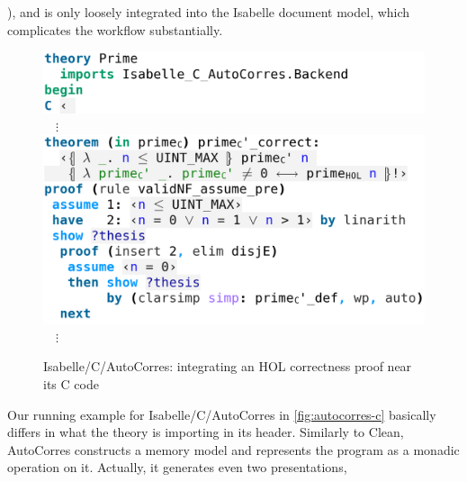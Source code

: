 \begin{isabellebody}
\begin{isamarkuptext}
), and is only loosely integrated into the Isabelle document
model, which complicates the workflow substantially.%
\end{isamarkuptext}\isamarkuptrue%
%
\begin{isamarkuptext}%
\begin{figure}
  \centering
\begin{minipage}{0.48\textwidth}
\includegraphics[width=\textwidth]{figures/A-C-Source80}\vspace{-3pt}\hfill\allowbreak%
\vspace{0pt}$\quad\vdots$\vspace{2pt}\hfill\allowbreak%
\includegraphics[width=\textwidth]{figures/A-C-Source8}\vspace{-3pt}\hfill\allowbreak%
\vspace{0pt}$\quad\vdots$\vspace{2pt}\hfill\allowbreak%
\end{minipage}
  \caption{Isabelle/C/AutoCorres: integrating an HOL correctness proof near its C code}
  \label{fig:autocorres-c}
\end{figure}
Our running example  for Isabelle/C/AutoCorres in \autoref{fig:autocorres-c} basically differs in what
the theory is importing in its header. Similarly to Clean, AutoCorres constructs a memory model and
represents the program as a monadic operation on it. Actually, it generates even two presentations,

\end{isamarkuptext}
\end{isabellebody}
